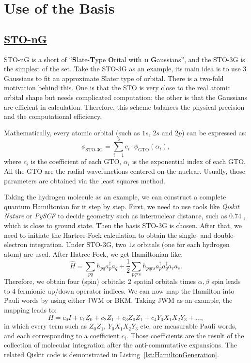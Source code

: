 \section{Use of the Basis}

\subsection{\href{https://en.wikipedia.org/wiki/STO-nG_basis_sets}{STO-nG}}
STO-nG is a short of ``\textbf{S}late-\textbf{T}ype \textbf{O}rital with \textbf{n} \textbf{G}aussians'', and the STO-3G is the simplest of the set. Take the STO-3G as an example, its main idea is to use 3 Gaussians to fit an approximate Slater type of orbital. There is a two-fold motivation behind this. One is that the STO is very close to the real atomic orbital shape but needs complicated computation; the other is that the Gaussians are efficient in calculation. Therefore, this scheme balances the physical precision and the computational efficiency.

Mathematically, every atomic orbital (such as $1s$, $2s$ and $2p$) can be expressed as:
\begin{equation}
    \phi_{\text{STO-3G}}=\sum_{i=1}^3 c_i\cdot\phi_{\text{GTO}}(\alpha_i),
\end{equation}
where $c_i$ is the coefficient of each GTO, $\alpha_i$ is the exponential index of each GTO. All the GTO are the radial wavefunctions centered on the nuclear. Usually, those parameters are obtained via the least squares method.

Taking the hydrogen molecule as an example, we can construct a complete quantum Hamiltonian for it step by step. First, we need to use tools like  \textit{Qiskit Nature} or \textit{PySCF} to decide geometry such as internuclear distance, such as 0.74 \text{\AA}, which is close to ground state. Then the basis STO-3G is chosen. After that, we need to initiate the Hartree-Fock calculation to obtain the single- and double- electron integration. Under STO-3G, two $1s$ orbitals (one for each hydrogen atom) are used. After Hatree-Fock, we get Hamiltonian like:
\begin{equation}
    \hat{H}=\sum_{pq}h_{pq}a^\dagger_pa_q+\frac{1}{2}\sum_{pqrs}h_{pqrs}a^\dagger_pa^\dagger_qa_ra_s.
\end{equation}
Therefore, we obtain four (spin) orbitals: 2 spatial orbitals times $\alpha, \beta$ spin leads to 4 fermionic up/down operator indices. We can now map the Hamilton into Pauli words by using either JWM or BKM. Taking JWM as an example, the mapping leads to:
\begin{equation}
    H=c_0I+c_1Z_0+c_2Z_1+c_3Z_0Z_1+c_4Y_0X_1X_2Y_3+\dots,
\end{equation}
in which every term such as $Z_0Z_1$, $Y_0X_1X_2Y_3$ etc. are measurable Pauli words, and each corresponding to a coefficient $c_i$. Those coefficients are the result of the collection of molecular integration after the anti-commutative expansions. The related Qiskit code is demonstrated in Listing~\ref{lst:HamiltonGeneration}.

